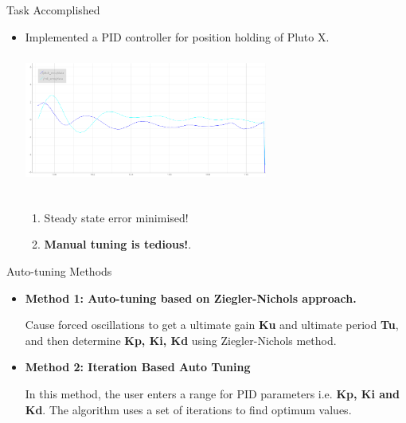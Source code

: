 \documentclass[10pt, a4paper]{beamer}
\begin{document}
\begin{frame}{Task Accomplished}
        \begin{itemize}
           	\item Implemented a PID controller for position holding of Pluto X.
           	\vspace{1em} 
           		\includegraphics[width= 8cm , height=5cm]{normal-demo-5.png}
           	\begin{enumerate}
		    \vspace{1em}\item Steady state error minimised!\vspace{1em}
		   \item \textbf{Manual tuning is tedious!}.\vspace{1em}
		\end{enumerate}
           	
        \end{itemize}
\end{frame}
		
\begin{frame}{Auto-tuning Methods }
        \begin{itemize}
           	\item \textbf{Method 1: Auto-tuning based on Ziegler-Nichols approach.}
           	
           	\vspace{1em}Cause forced oscillations to get a ultimate gain \textbf{Ku} and ultimate period \textbf{Tu}, and then determine \textbf{Kp, Ki, Kd} using Ziegler-Nichols method.
           	
           	\vspace{3em} 
           	\item\textbf{Method 2: Iteration Based Auto Tuning}
           	
           	\vspace{1em}In this method, the user enters a range for PID parameters i.e.\textbf{ Kp, Ki and Kd}. The algorithm uses a set of iterations to find optimum values.
           	
           	
        \end{itemize}
\end{frame}
\end{document}
